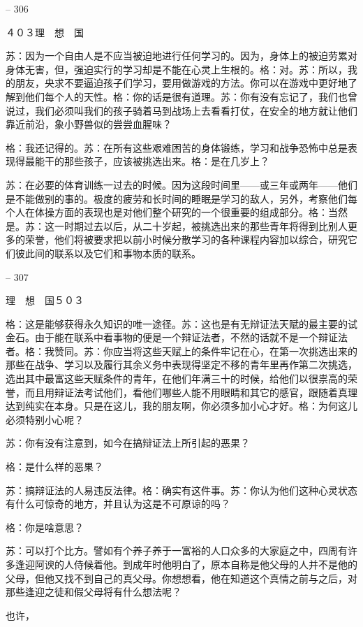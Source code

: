 \documentclass[11pt,oneside]{book}
\begin{document}
\begin{common-format}
-- 306

    ４０３理　想　国

    苏：因为一个自由人是不应当被迫地进行任何学习的。因为，身体上的被迫劳累对身体无害，但，强迫实行的学习却是不能在心灵上生根的。格：对。苏：所以，我的朋友，央求不要逼迫孩子们学习，要用做游戏的方法。你可以在游戏中更好地了解到他们每个人的天性。格：你的话是很有道理。苏：你有没有忘记了，我们也曾说过，我们必须叫我们的孩子骑着马到战场上去看看打仗，在安全的地方就让他们靠近前沿，象小野兽似的尝尝血腥味？

    格：我还记得的。苏：在所有这些艰难困苦的身体锻练，学习和战争恐怖中总是表现得最能干的那些孩子，应该被挑选出来。格：是在几岁上？

    苏：在必要的体育训练一过去的时候。因为这段时间里——或三年或两年——他们是不能做别的事的。极度的疲劳和长时间的睡眠是学习的敌人，另外，考察他们每个人在体操方面的表现也是对他们整个研究的一个很重要的组成部分。格：当然是。苏：这一时期过去以后，从二十岁起，被挑选出来的那些青年将得到比别人更多的荣誉，他们将被要求把以前小时候分散学习的各种课程内容加以综合，研究它们彼此间的联系以及它们和事物本质的联系。

    

-- 307

    理　想　国５０３

    格：这是能够获得永久知识的唯一途径。苏：这也是有无辩证法天赋的最主要的试金石。由于能在联系中看事物的便是一个辩证法者，不然的话就不是一个辩证法者。格：我赞同。苏：你应当将这些天赋上的条件牢记在心，在第一次挑选出来的那些在战争、学习以及履行其余义务中表现得坚定不移的青年里再作第二次挑选，选出其中最富这些天赋条件的青年，在他们年满三十的时候，给他们以很祟高的荣誉，而且用辩证法考试他们，看他们哪些人能不用眼睛和其它的感官，跟随着真理达到纯实在本身。只是在这儿，我的朋友啊，你必须多加小心才好。格：为何这儿必须特别小心呢？

    苏：你有没有注意到，如今在搞辩证法上所引起的恶果？

    格：是什么样的恶果？

    苏：搞辩证法的人易违反法律。格：确实有这件事。苏：你认为他们这种心灵状态有什么可惊奇的地方，并且认为这是不可原谅的吗？

    格：你是啥意思？

    苏：可以打个比方。譬如有个养子养于一富裕的人口众多的大家庭之中，四周有许多逢迎阿谀的人侍候着他。到成年时他明白了，原本自称是他父母的人并不是他的父母，但他又找不到自己的真父母。你想想看，他在知道这个真情之前与之后，对那些逢迎之徒和假父母将有什么想法呢？

    也许，


\end{common-format}
\end{document}
